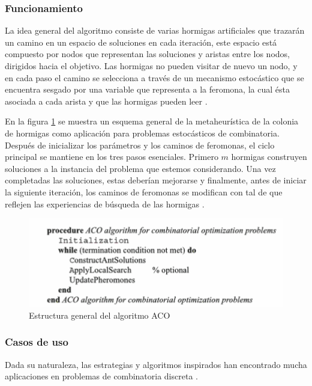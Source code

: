 \documentclass[twocolumn,spanish]{revtex4-1}
\begin{document}
\subsubsection{Funcionamiento}

La idea general del algoritmo consiste de varias hormigas artificiales que trazarán un camino en un espacio de soluciones en cada iteración, este espacio está compuesto por nodos que representan las soluciones y aristas entre los nodos, dirigidos hacia el objetivo. Las hormigas no pueden visitar de nuevo un nodo, y en cada paso el camino se selecciona a través de un mecanismo estocástico que se encuentra sesgado por una variable que representa a la feromona, la cual ésta asociada a cada arista y que las hormigas pueden leer \cite{dorigo2019ant}.

En la figura \ref{fig:ACOAlgorithm} se muestra un esquema general de la metaheurística de la colonia de hormigas como aplicación para problemas estocásticos de combinatoria. Después de inicializar los parámetros y los caminos de feromonas, el ciclo principal se mantiene en los tres pasos esenciales. Primero $m$ hormigas construyen soluciones a la instancia del problema que estemos considerando. Una vez completadas las soluciones, estas deberían mejorarse y finalmente, antes de iniciar la siguiente iteración, los caminos de feromonas se modifican con tal de que reflejen las experiencias de búsqueda de las hormigas \cite{dorigo2019ant}. 

\begin{figure}
    \centering
    \includegraphics[width=0.9\linewidth]{ACOalgorithm}
    \caption{Estructura general del algoritmo ACO \cite{dorigo2019ant}}
    \label{fig:ACOAlgorithm}
\end{figure}

\subsubsection{Casos de uso}

Dada su naturaleza, las estrategias y algoritmos inspirados han encontrado mucha aplicaciones en problemas de combinatoria discreta \cite{6281180}.
\end{document}
